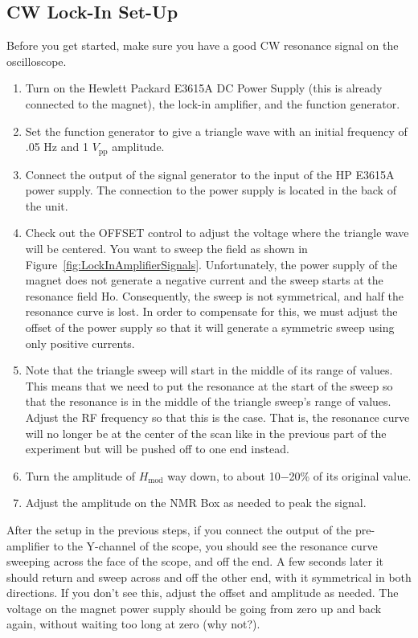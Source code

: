 \documentclass{../lab}
\begin{document}
\subsection{CW Lock-In Set-Up}
Before you get started, make sure you have a good CW resonance signal on the oscilloscope. 
\begin{enumerate}
    \item Turn on the Hewlett Packard E3615A DC Power Supply (this is already connected to the magnet), the lock-in amplifier, and the function generator. 
    \item Set the function generator to give a triangle wave with an initial frequency of .05 Hz and 1 $V_\text{pp}$ amplitude.
    \item Connect the output of the signal generator to the input of the HP E3615A power supply. The connection to the power supply is located in the back of the unit.
    \item Check out the OFFSET control to adjust the voltage where the triangle wave will be centered. You want to sweep the field as shown in Figure~\ref{fig:LockInAmplifierSignals}. Unfortunately, the power supply of the magnet does not generate a negative current and the sweep starts at the resonance field Ho. Consequently, the sweep is not symmetrical, and half the resonance curve is lost. In order to compensate for this, we must adjust the offset of the power supply so that it will generate a symmetric sweep using only positive currents. 
    \item Note that the triangle sweep will start in the middle of its range of values. This means that we need to put the resonance at the start of the sweep so that the resonance is in the middle of the triangle sweep's range of values. Adjust the RF frequency so that this is the case. That is, the resonance curve will no longer be at the center of the scan like in the previous part of the experiment but will be pushed off to one end instead.
    \item Turn the amplitude of $H_\text{mod}$ way down, to about 10$-$20\% of its original value.
    \item Adjust the amplitude on the NMR Box as needed to peak the signal.
\end{enumerate}

After the setup in the previous steps, if you connect the output of the pre-amplifier to the Y-channel of the scope, you should see the resonance curve sweeping across the face of the scope, and off the end. A few seconds later it should return and sweep across and off the other end, with it symmetrical in both directions. If you don't see this, adjust the offset and amplitude as needed. The voltage on the magnet power supply should be going from zero up and back again, without waiting too long at zero (why not?).
\end{document}
